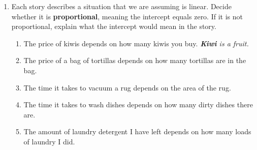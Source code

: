 \begin{enumerate}
\item Each story describes a situation that we are assuming is linear.  Decide whether it is \textbf{proportional}, meaning the intercept equals zero.  If it is not proportional, explain what the intercept would mean in the story. 
\begin{enumerate}
\item The price of kiwis depends on how many kiwis you buy. \emph{\textbf{Kiwi} is a fruit.} \vfill
\item The price of a bag of tortillas depends on how many tortillas are in the bag.  \vfill
\item The time it takes to vacuum a rug depends on the area of the rug.  \vfill
\item The time it takes to wash dishes depends on how many dirty dishes there are.  \vfill
\item The amount of laundry detergent I have left depends on how many loads of laundry I did. \vfill
\end{enumerate}

\end{enumerate}


